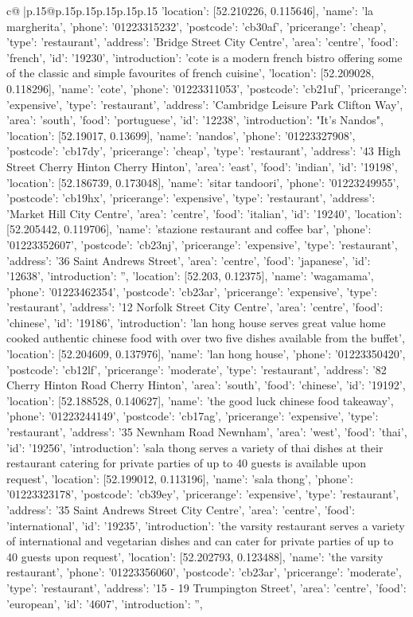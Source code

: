 \documentclass{article}
\begin{document}
{\begin{supertabular}{c@{$\;$}|p{.15\linewidth}@{}p{.15\linewidth}p{.15\linewidth}p{.15\linewidth}p{.15\linewidth}p{.15\linewidth}}
{{{'location': [52.210226, 0.115646], 'name': 'la margherita', 'phone': '01223315232', 'postcode': 'cb30af', 'pricerange': 'cheap', 'type': 'restaurant'}, {'address': 'Bridge Street City Centre', 'area': 'centre', 'food': 'french', 'id': '19230', 'introduction': 'cote is a modern french bistro offering some of the classic and simple favourites of french cuisine', 'location': [52.209028, 0.118296], 'name': 'cote', 'phone': '01223311053', 'postcode': 'cb21uf', 'pricerange': 'expensive', 'type': 'restaurant'}, {'address': 'Cambridge Leisure Park Clifton Way', 'area': 'south', 'food': 'portuguese', 'id': '12238', 'introduction': "It's Nandos", 'location': [52.19017, 0.13699], 'name': 'nandos', 'phone': '01223327908', 'postcode': 'cb17dy', 'pricerange': 'cheap', 'type': 'restaurant'}, {'address': '43 High Street Cherry Hinton Cherry Hinton', 'area': 'east', 'food': 'indian', 'id': '19198', 'location': [52.186739, 0.173048], 'name': 'sitar tandoori', 'phone': '01223249955', 'postcode': 'cb19hx', 'pricerange': 'expensive', 'type': 'restaurant'}, {'address': 'Market Hill City Centre', 'area': 'centre', 'food': 'italian', 'id': '19240', 'location': [52.205442, 0.119706], 'name': 'stazione restaurant and coffee bar', 'phone': '01223352607', 'postcode': 'cb23nj', 'pricerange': 'expensive', 'type': 'restaurant'}, {'address': '36 Saint Andrews Street', 'area': 'centre', 'food': 'japanese', 'id': '12638', 'introduction': '', 'location': [52.203, 0.12375], 'name': 'wagamama', 'phone': '01223462354', 'postcode': 'cb23ar', 'pricerange': 'expensive', 'type': 'restaurant'}, {'address': '12 Norfolk Street City Centre', 'area': 'centre', 'food': 'chinese', 'id': '19186', 'introduction': 'lan hong house serves great value home cooked authentic chinese food with over two five dishes available from the buffet', 'location': [52.204609, 0.137976], 'name': 'lan hong house', 'phone': '01223350420', 'postcode': 'cb12lf', 'pricerange': 'moderate', 'type': 'restaurant'}, {'address': '82 Cherry Hinton Road Cherry Hinton', 'area': 'south', 'food': 'chinese', 'id': '19192', 'location': [52.188528, 0.140627], 'name': 'the good luck chinese food takeaway', 'phone': '01223244149', 'postcode': 'cb17ag', 'pricerange': 'expensive', 'type': 'restaurant'}, {'address': '35 Newnham Road Newnham', 'area': 'west', 'food': 'thai', 'id': '19256', 'introduction': 'sala thong serves a variety of thai dishes at their restaurant catering for private parties of up to 40 guests is available upon request', 'location': [52.199012, 0.113196], 'name': 'sala thong', 'phone': '01223323178', 'postcode': 'cb39ey', 'pricerange': 'expensive', 'type': 'restaurant'}, {'address': '35 Saint Andrews Street City Centre', 'area': 'centre', 'food': 'international', 'id': '19235', 'introduction': 'the varsity restaurant serves a variety of international and vegetarian dishes and can cater for private parties of up to 40 guests upon request', 'location': [52.202793, 0.123488], 'name': 'the varsity restaurant', 'phone': '01223356060', 'postcode': 'cb23ar', 'pricerange': 'moderate', 'type': 'restaurant'}, {'address': '15 - 19 Trumpington Street', 'area': 'centre', 'food': 'european', 'id': '4607', 'introduction': '', }}}
\end{supertabular}}
\end{document}
